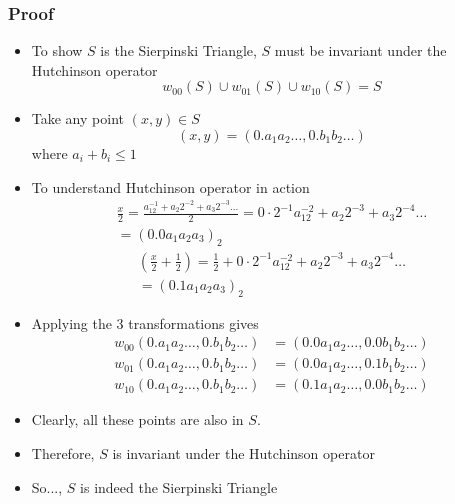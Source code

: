 \documentclass{beamer}
\begin{document}
\begin{frame}
    \frametitle{Proof}
    \begin{itemize}
        \item To show $S$ is the Sierpinski Triangle, $S$ must be invariant under the Hutchinson operator
        \begin{equation*}
            w_{00}(S) \cup w_{01}(S) \cup w_{10}(S) = S 
        \end{equation*}
        \item Take any point $(x,y) \in S$
        \begin{equation*}
            (x,y) = (0.a_1a_2\dots,0.b_1 b_2 \dots)
        \end{equation*}
        where $a_i + b_i \leq 1$
        \item To understand Hutchinson operator in action 
        \begin{gather*}
            \frac{x}{2} = \frac{a_12^{-1} + a_2 2^{-2} + a_3 2^{-3}\dots}{2} = 0 \cdot 2^{-1} a_12^{-2} + a_2 2^{-3} + a_3 2^{-4}\dots \\ = (0.0a_1 a_2 a_3)_2
        \end{gather*}
        \begin{gather*}
            \left(\frac{x}{2}+\frac{1}{2}\right) = \frac{1}{2} + 0 \cdot 2^{-1} a_12^{-2} + a_2 2^{-3} + a_3 2^{-4}\dots \\
            =(0.1a_1 a_2 a_3)_2
        \end{gather*}
    \end{itemize}
\end{frame}

\begin{frame}
    \begin{itemize}
        \item Applying the 3 transformations gives 
        \begin{align*}
            w_{00}(0.a_1a_2\dots,0.b_1 b_2 \dots) &= (0.0a_1a_2\dots,0.0b_1 b_2 \dots) \\
            w_{01}(0.a_1a_2\dots,0.b_1 b_2 \dots) &= (0.0a_1a_2\dots,0.1b_1 b_2 \dots) \\
            w_{10}(0.a_1a_2\dots,0.b_1 b_2 \dots) &= (0.1a_1a_2\dots,0.0b_1 b_2 \dots)
        \end{align*}
        \item Clearly, all these points are also in $S$.
        \item Therefore, $S$ is invariant under the Hutchinson operator
        \item So..., $S$ is indeed the Sierpinski Triangle 
    \end{itemize}
\end{frame}
\end{document}
